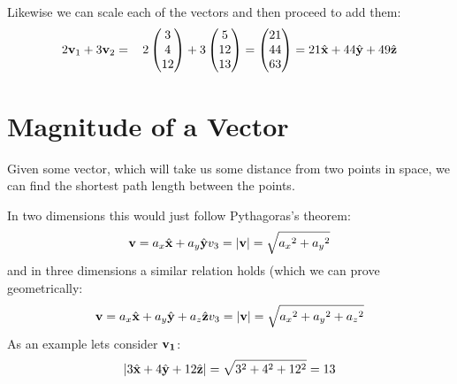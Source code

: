\documentclass[letterpaper,10pt,english]{jupyterBook}
\begin{document}
\sphinxAtStartPar
Likewise we can scale each of the vectors and then proceed to add them:
\begin{equation*}
\begin{split}2{\bf v}_1 + 3{\bf v}_2  &=&\,  2\begin{pmatrix}
 3 \\
 4 \\
 12 
\end{pmatrix} + 3\begin{pmatrix}
 5 \\
 12 \\
 13 
\end{pmatrix} = \begin{pmatrix}
 21 \\
 44 \\
 63 
\end{pmatrix} = 21\hat{\bf x} + 44\hat{\bf y} + 49\hat{\bf z}\end{split}
\end{equation*}

\section{Magnitude of a Vector}
\label{\detokenize{VectorCalculus/vectoralgebra:magnitude-of-a-vector}}
\sphinxAtStartPar
Given some vector, which will take us some distance from two points in space, we can find the shortest path length between the points.

\sphinxAtStartPar
In two dimensions this would just follow Pythagoras’s theorem:
\begin{equation*}
\begin{split}{\bf v} = a_x\hat{\bf x} + a_y\hat{\bf y}
v_3 = |{\bf v}| = \sqrt{{a_x}^2 + {a_y}^2}\end{split}
\end{equation*}
\sphinxAtStartPar
and in three dimensions a similar relation holds (which we can prove geometrically:
\begin{equation*}
\begin{split}{\bf v} = a_x\hat{\bf x} + a_y\hat{\bf y} + a_z\hat{\bf z}
v_3 = |{\bf v}| = \sqrt{{a_x}^2 + {a_y}^2 + {a_z}^2} \end{split}
\end{equation*}
\sphinxAtStartPar
As an example lets consider \(\bf v_1\):
\begin{equation*}
\begin{split}|3\hat{\bf x} + 4\hat{\bf y} + 12\hat{\bf z}| = \sqrt{3^2 + 4^2 + 12^2} = 13\end{split}
\end{equation*}
\end{document}
